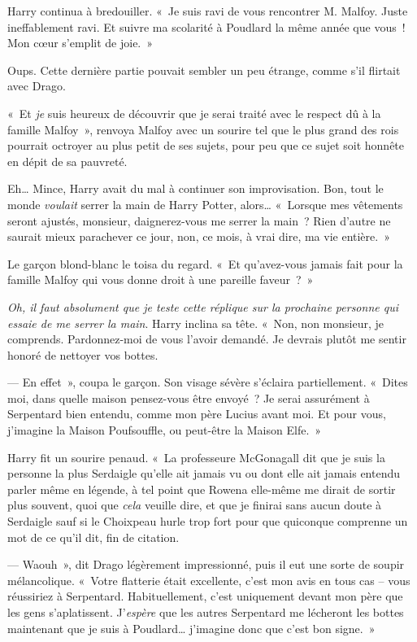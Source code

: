 Harry continua à bredouiller. «~Je suis ravi de vous rencontrer M.  Malfoy. Juste ineffablement ravi. Et suivre ma scolarité à Poudlard la même année que vous~! Mon cœur s'emplit de joie.~»

Oups. Cette dernière partie pouvait sembler un peu étrange, comme
s'il flirtait avec Drago.

«~Et \emph{je} suis heureux de découvrir que je serai traité avec le respect dû à la famille Malfoy~», renvoya Malfoy avec un sourire tel que le plus grand des rois pourrait octroyer au plus petit de ses sujets, pour peu que ce sujet soit honnête en dépit de sa pauvreté.

Eh… Mince, Harry avait du mal à continuer son improvisation. Bon, tout le monde \emph{voulait} serrer la main de Harry Potter, alors… «~Lorsque mes vêtements seront ajustés, monsieur, daignerez-vous me serrer la main~? Rien d'autre ne saurait mieux parachever ce jour, non, ce mois, à vrai dire, ma vie entière.~»

Le garçon blond-blanc le toisa du regard. «~Et qu'avez-vous jamais fait pour la famille Malfoy qui vous donne droit à une pareille faveur~?~»

\emph{Oh, il faut absolument que je teste cette réplique sur la prochaine personne qui essaie de me serrer la main}. Harry inclina sa tête. «~Non, non monsieur, je comprends. Pardonnez-moi de vous l'avoir demandé. Je devrais plutôt me sentir honoré de nettoyer vos bottes.

--- En effet~», coupa le garçon. Son visage sévère s'éclaira partiellement. «~Dites moi, dans quelle maison pensez-vous être envoyé~? Je serai assurément à Serpentard bien entendu, comme mon père Lucius avant moi. Et pour vous, j'imagine la Maison Poufsouffle, ou peut-être la Maison Elfe.~»

Harry fit un sourire penaud. «~La professeure McGonagall dit que je suis la personne la plus Serdaigle qu'elle ait jamais vu ou dont elle ait jamais entendu parler même en légende, à tel point que Rowena elle-même me dirait de sortir plus souvent, quoi que \emph{cela} veuille dire, et que je finirai sans aucun doute à Serdaigle sauf si le Choixpeau hurle trop fort pour que quiconque comprenne un mot de ce qu'il dit, fin de citation.

--- Waouh~», dit Drago légèrement impressionné, puis il eut une sorte de soupir mélancolique. «~Votre flatterie était excellente, c'est mon avis en tous cas -- vous réussiriez à Serpentard. Habituellement, c'est uniquement devant mon père que les gens s'aplatissent.  J'\emph{espère} que les autres Serpentard me lécheront les bottes maintenant que je suis à Poudlard… j'imagine donc que c'est bon signe.~»

